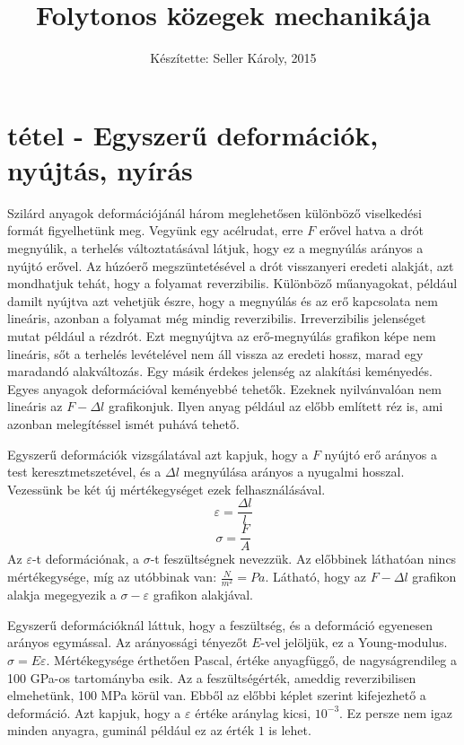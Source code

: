 \documentclass[a4paper,12pt]{article}
\date{}
\begin{document}
\title{Folytonos közegek mechanikája}
\author{Készítette: Seller Károly, 2015} %
\maketitle

\section{tétel - Egyszerű deformációk, nyújtás, nyírás}
Szilárd anyagok deformációjánál három meglehetősen különböző viselkedési formát figyelhetünk meg. Vegyünk egy acélrudat, erre $F$ erővel hatva a drót megnyúlik, a terhelés változtatásával látjuk, hogy ez a megnyúlás arányos a nyújtó erővel. Az húzóerő megszüntetésével a drót visszanyeri eredeti alakját, azt mondhatjuk tehát, hogy a folyamat reverzibilis. Különböző műanyagokat, például damilt nyújtva azt vehetjük észre, hogy a megnyúlás és az erő kapcsolata nem lineáris, azonban a folyamat még mindig reverzibilis. Irreverzibilis jelenséget mutat például a rézdrót. Ezt megnyújtva az erő-megnyúlás grafikon képe nem lineáris, sőt a terhelés levételével nem áll vissza az eredeti hossz, marad egy maradandó alakváltozás. Egy másik érdekes jelenség az alakítási keményedés. Egyes anyagok deformációval keményebbé tehetők. Ezeknek nyilvánvalóan nem lineáris az $F-\Delta l$ grafikonjuk. Ilyen anyag például az előbb említett réz is, ami azonban melegítéssel ismét puhává tehető.

Egyszerű deformációk vizsgálatával azt kapjuk, hogy a $F$ nyújtó erő arányos a test keresztmetszetével, és a $\Delta l$ megnyúlása arányos a nyugalmi hosszal. Vezessünk be két új mértékegységet ezek felhasználásával.
\begin{equation}
\varepsilon=\frac{\Delta l}{l}
\end{equation}
\begin{equation}
\sigma=\frac{F}{A}
\end{equation}
Az $\varepsilon$-t deformációnak, a $\sigma$-t feszültségnek nevezzük. Az előbbinek láthatóan nincs mértékegysége, míg az utóbbinak van: $\frac{N}{m^2}=Pa$. Látható, hogy az $F-\Delta l$ grafikon alakja megegyezik a $\sigma-\varepsilon$ grafikon alakjával.


Egyszerű deformációknál láttuk, hogy a feszültség, és a deformáció egyenesen arányos egymással. Az arányossági tényezőt $E$-vel jelöljük, ez a Young-modulus. $\sigma=E\varepsilon$. Mértékegysége érthetően Pascal, értéke anyagfüggő, de nagyságrendileg a 100 GPa-os tartományba esik. Az a feszültségérték, ameddig reverzibilisen elmehetünk, 100 MPa körül van. Ebből az előbbi képlet szerint kifejezhető a deformáció. Azt kapjuk, hogy a $\varepsilon$ értéke aránylag kicsi, $10^{-3}$. Ez persze nem igaz minden anyagra, guminál például ez az érték $1$ is lehet.
\end{document}
